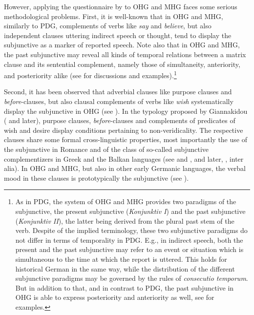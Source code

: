 \documentclass[output=paper,colorlinks,citecolor=brown]{langscibook}
\begin{document}
However, applying the questionnaire by \citet{Dahl2000} to OHG and MHG faces some serious methodological problems. First, it is well-known that in OHG and MHG, similarly to PDG, complements of verbs like \textit{say} and \textit{believe}, but also independent clauses uttering indirect speech or thought, tend to display the subjunctive as a marker of reported speech. Note also that in OHG and MHG, the past subjunctive may reveal all kinds of temporal relations between a matrix clause and its sentential complement, namely those of simultaneity, anteriority, and posteriority alike (see \cite{Petrova2008} for discussions and examples).\footnote{As in PDG, the system of OHG and MHG provides two paradigms of the subjunctive, the present subjunctive (\textit{Konjunktiv I}) and the past subjunctive (\textit{Konjunktiv II}), the latter being derived from the plural past stem of the verb. Despite of the implied terminology, these two subjunctive paradigms do not differ in terms of temporality in PDG. E.g., in indirect speech, both the present and the past subjunctive may refer to an event or situation which is simultaneous to the time at which the report is uttered. This holds for historical German in the same way, while the distribution of the different subjunctive paradigms may be governed by the rules of \textit{consecutio temporum}. But in addition to that, and in contrast to PDG, the past subjunctive in OHG is able to express posteriority and anteriority as well, see \citet[13 and 162–190]{Petrova2008} for examples.}

Second, it has been observed that adverbial clauses like purpose clauses and \textit{before}-clauses, but also clausal complements of verbs like \textit{wish} systematically display the subjunctive in OHG (see \cite{ConiglioEtAl2018}). In the typology proposed by Giannakidou (\citeyear{Giannakidou1998} and later), purpose clauses, \textit{before}-clauses and complements of predicates of wish and desire display conditions pertaining to non-veridicality. The respective clauses share some formal cross-linguistic properties, most importantly the use of the subjunctive in Romance and of the class of so-called subjunctive complementizers in Greek and the Balkan languages (see \cite{Farkas1985} and \citeyear{Farkas1992}, \cite{Giannakidou1998} and later, \cite{Roussou2009}, inter alia). In OHG and MHG, but also in other early Germanic languages, the verbal mood in these clauses is prototypically the subjunctive (see \cite{ConiglioEtAl2018}).
\end{document}

